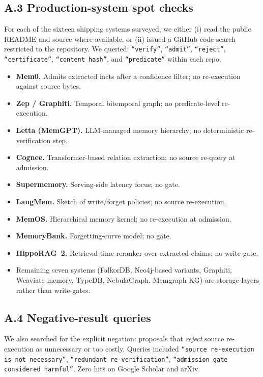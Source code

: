\documentclass[10pt,a4paper]{article}
\begin{document}
\subsection*{A.3 Production-system spot checks}
For each of the sixteen shipping systems surveyed, we either (i) read
the public README and source where available, or (ii) issued a GitHub
code search restricted to the repository. We queried:
\texttt{``verify''}, \texttt{``admit''}, \texttt{``reject''},
\texttt{``certificate''}, \texttt{``content hash''}, and
\texttt{``predicate''} within each repo.

\begin{itemize}[leftmargin=*,itemsep=2pt,topsep=2pt]
  \item \textbf{Mem0.} Admits extracted facts after a confidence filter;
        no re-execution against source bytes.
  \item \textbf{Zep / Graphiti.} Temporal bitemporal graph; no
        predicate-level re-execution.
  \item \textbf{Letta (MemGPT).} LLM-managed memory hierarchy; no
        deterministic re-verification step.
  \item \textbf{Cognee.} Transformer-based relation extraction; no
        source re-query at admission.
  \item \textbf{Supermemory.} Serving-side latency focus; no gate.
  \item \textbf{LangMem.} Sketch of write/forget policies; no source
        re-execution.
  \item \textbf{MemOS.} Hierarchical memory kernel; no re-execution at
        admission.
  \item \textbf{MemoryBank.} Forgetting-curve model; no gate.
  \item \textbf{HippoRAG~2.} Retrieval-time reranker over extracted
        claims; no write-gate.
  \item Remaining seven systems (FalkorDB, Neo4j-based variants,
        Graphiti, Weaviate memory, TypeDB, NebulaGraph, Memgraph-KG)
        are storage layers rather than write-gates.
\end{itemize}

\subsection*{A.4 Negative-result queries}
We also searched for the explicit negation: proposals that \emph{reject}
source re-execution as unnecessary or too costly. Queries included
\texttt{``source re-execution is not necessary''},
\texttt{``redundant re-verification''},
\texttt{``admission gate considered harmful''}. Zero hits on Google
Scholar and arXiv.
\end{document}
